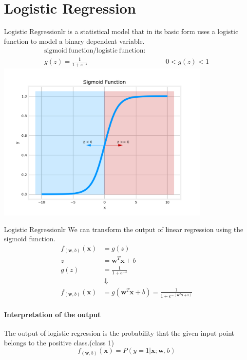 \section{Logistic Regression}
\begin{dfnbox}{Logistic Regression}{lr}
    \hspace{2em} is a statistical model that in its basic form uses a logistic function
    to model a binary dependent variable.
    \begin{align}
        \mathrm{sigmoid\ function / logistic\ function:}& \nonumber\\
        g(z) = \frac{1}{1 + e^{-z}}& \qquad 0 < g(z) < 1
    \end{align}
    \centering
    \includegraphics*[width=0.8\textwidth]{images/Figure 4}
\end{dfnbox}

\begin{thmbox}{Logistic Regression}{lr}
    We can transform the output of linear regression using the sigmoid function.
    \begin{align*}
        f_{(\mathbf{w}, b)}(\mathbf{x}) &= g(z) \\
        z &= \mathbf{w}^T \mathbf{x} + b \\
        g(z) &= \frac{1}{1 + e^{-z}}\\
        & \ \Downarrow\\
        f_{(\mathbf{w}, b)}(\mathbf{x}) &= g(\mathbf{w}^T \mathbf{x} + b) = \frac{1}{1 + e^{-(\mathbf{w}^T \mathbf{x} + b)}}
    \end{align*}
\end{thmbox}

\paragraph*{Interpretation of the output}
The output of logistic regression is the probability that 
the given input point belongs to the positive class.(class 1)\\
\begin{equation}
    f_{(\mathbf{w}, b)}(\mathbf{x}) = P(y = 1 | \mathbf{x}; \mathbf{w}, b)
\end{equation}

